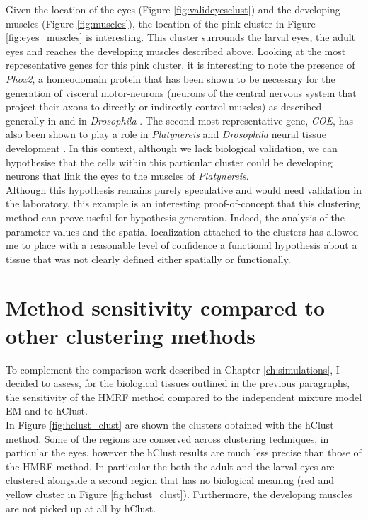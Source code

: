 	Given the location of the eyes (Figure \ref{fig:valideyesclust}) and the developing muscles (Figure \ref{fig:muscles}), the location of the pink cluster in Figure \ref{fig:eyes_muscles} is interesting. This cluster surrounds the larval eyes, the adult eyes and reaches the developing muscles described above. Looking at the most representative genes for this pink cluster, it is interesting to note the presence of {\it{Phox2}}, a homeodomain protein that has been shown to be necessary for the generation of visceral motor-neurons (neurons of the central nervous system that project their axons to directly or indirectly control muscles) as described generally in \citep{brunet02} and in \emph{Drosophila} \citep{briscoe99}. The second most representative gene, {\it{COE}}, has also been shown to play a role in \emph{Platynereis} and \emph{Drosophila} neural tissue development \citep{demilly11}. In this context, although we lack biological validation, we can hypothesise that the cells within this particular cluster could be developing neurons that link the eyes to the muscles of \emph{Platynereis}.\\
	
	 Although this hypothesis remains purely speculative and would need validation in the laboratory, this example is an interesting proof-of-concept that this clustering method can prove useful for hypothesis generation. Indeed, the analysis of the parameter values and the spatial localization attached to the clusters has allowed me to place with a reasonable level of confidence a functional hypothesis about a tissue that was not clearly defined either spatially or functionally. \\
	 
\section{Method sensitivity compared to other clustering methods}
	To complement the comparison work described in Chapter \ref{ch:simulations}, I decided to assess, for the biological tissues outlined in the previous paragraphs, the sensitivity of the HMRF method compared to the independent mixture model EM and to hClust.\\
	
	In Figure \ref{fig:hclust_clust} are shown the clusters obtained with the hClust method. Some of the regions are conserved across clustering techniques, in particular the eyes. however the hClust results are much less precise than those of the HMRF method. In particular the both the adult and the larval eyes are clustered alongside a second region that has no biological meaning (red and yellow cluster in Figure \ref{fig:hclust_clust}). Furthermore, the developing muscles are not picked up at all by hClust.
	
